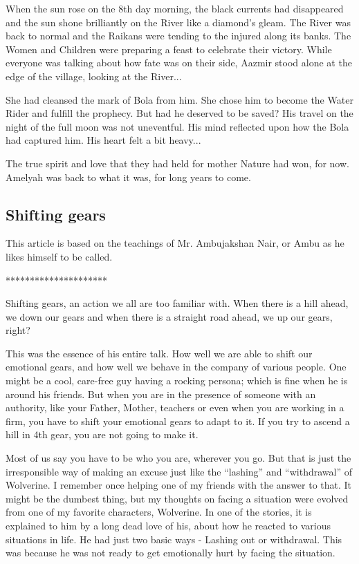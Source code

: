 \documentclass[twoside,11pt,titlepage]{article}
\begin{document}
When the sun rose on the 8th day morning, the black currents had disappeared and the sun shone brilliantly on the River like a diamond's gleam. The River was back to normal and the Raikans were tending to the injured along its banks. The Women and Children were preparing a feast to celebrate their victory. While everyone was talking about how fate was on their side, Aazmir stood alone at the edge of the village, looking at the River...

She had cleansed the mark of Bola from him. She chose him to become the Water Rider and fulfill the prophecy. But had he deserved to be saved? His travel on the night of the full moon was not uneventful. His mind reflected upon how the Bola had captured him. His heart felt a bit heavy...

The true spirit and love that they had held for mother Nature had won, for now. Amelyah was back to what it was, for long years to come.

\newpage
\begin{center}
  \section{Shifting gears}
\end{center}
\bigskip
\bigskip
\bigskip

This article is based on the teachings of Mr. Ambujakshan Nair, or Ambu as he likes himself to be called.

\bigskip
\begin{center}
*********************
\end{center}

Shifting gears, an action we all are too familiar with. When there is a hill ahead, we down our gears and when there is a straight road ahead, we up our gears, right?

This was the essence of his entire talk. How well we are able to shift our emotional gears, and how well we behave in the company of various people. One might be a cool, care-free guy having a rocking persona; which is fine when he is around his friends. But when you are in the presence of someone with an authority, like your Father, Mother, teachers or even when you are working in a firm, you have to shift your emotional gears to adapt to it. If you try to ascend a hill in 4th gear, you are not going to make it.

Most of us say you have to be who you are, wherever you go. But that is just the irresponsible way of making an excuse just like the ``lashing'' and ``withdrawal'' of Wolverine. I remember once helping one of my friends with the answer to that. It might be the dumbest thing, but my thoughts on facing a situation were evolved from one of my favorite characters, Wolverine. In one of the stories, it is explained to him by a long dead love of his, about how he reacted to various situations in life. He had just two basic ways - Lashing out or withdrawal. This was because he was not ready to get emotionally hurt by facing the situation.
\end{document}
